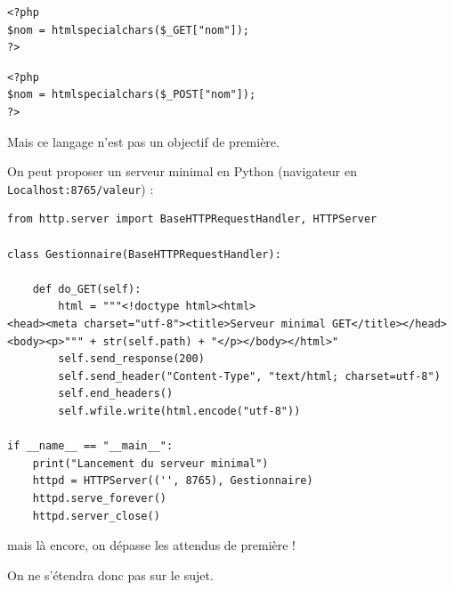 \begin{multicols}{2}
\begin{verbatim}
<?php
$nom = htmlspecialchars($_GET["nom"]);
?>
\end{verbatim}

\begin{verbatim}
<?php
$nom = htmlspecialchars($_POST["nom"]);
?>
\end{verbatim}
\end{multicols}

Mais ce langage n'est pas un objectif de première.

On peut proposer un serveur minimal en Python (navigateur en \texttt{Localhost:8765/valeur}) :

\begin{verbatim}
from http.server import BaseHTTPRequestHandler, HTTPServer

class Gestionnaire(BaseHTTPRequestHandler):

    def do_GET(self):
        html = """<!doctype html><html>
<head><meta charset="utf-8"><title>Serveur minimal GET</title></head>
<body><p>""" + str(self.path) + "</p></body></html>"
        self.send_response(200)
        self.send_header("Content-Type", "text/html; charset=utf-8")
        self.end_headers()
        self.wfile.write(html.encode("utf-8"))

if __name__ == "__main__":
    print("Lancement du serveur minimal")
    httpd = HTTPServer(('', 8765), Gestionnaire)
    httpd.serve_forever()
    httpd.server_close()
\end{verbatim}


mais là encore, on dépasse les attendus de première !

\medskip

On ne s'étendra donc pas sur le sujet.